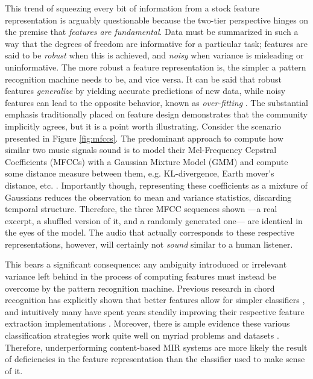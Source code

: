 This trend of squeezing every bit of information from a stock feature representation is arguably questionable because the two-tier perspective hinges on the premise that \emph{features are fundamental}.
Data must be summarized in such a way that the degrees of freedom are informative for a particular task; features are said to be \emph{robust} when this is achieved, and \emph{noisy} when variance is misleading or uninformative.
The more robust a feature representation is, the simpler a pattern recognition machine needs to be, and vice versa.
It can be said that robust features \emph{generalize} by yielding accurate predictions of new data, while noisy features can lead to the opposite behavior, known as \emph{over-fitting} \cite{Bishop2006}.
The substantial emphasis traditionally placed on feature design demonstrates that the community implicitly agrees, but it is a point worth illustrating.
Consider the scenario presented in Figure \ref{fig:mfccs}.
The predominant approach to compute how similar two music signals sound is to model their Mel-Frequency Cepstral Coefficients (MFCCs) with a Gaussian Mixture Model (GMM) and compute some distance measure between them, e.g. KL-divergence, Earth mover's distance, etc. \cite{Berenzweig2004}.
Importantly though, representing these coefficients as a mixture of Gaussians reduces the observation to mean and variance statistics, discarding temporal structure.
Therefore, the three MFCC sequences shown ---a real excerpt, a shuffled version of it, and a randomly generated one--- are identical in the eyes of the model.
The audio that actually corresponds to these respective representations, however, will certainly not \emph{sound} similar to a human listener.

This bears a significant consequence: any ambiguity introduced or irrelevant variance left behind in the process of computing features must instead be overcome by the pattern recognition machine.
Previous research in chord recognition has explicitly shown that better features allow for simpler classifiers \cite{Cho2011}, and intuitively many have spent years steadily improving their respective feature extraction implementations \cite{Lyon2010,Mueller2011b}.
Moreover, there is ample evidence these various classification strategies work quite well on myriad problems and datasets \cite{Bishop2006}.
Therefore, underperforming content-based MIR systems are more likely the result of deficiencies in the feature representation than the classifier used to make sense of it.


